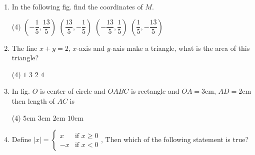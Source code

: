 \documentclass{article}
\renewcommand{\frac}{\dfrac}
\begin{document}
\begin{enumerate}
    \item In the following fig. find the coordinates of $M$.
    \begin{center}
    \end{center}
        \begin{tasks}(4)
            	\task $\left(-\frac{1}{5}, \frac{13}{5}\right)$\ans
            	\task $\left(\frac{13}{5}, -\frac{1}{5}\right)$
            	\task $\left(-\frac{13}{5}, \frac{1}{5}\right)$
            	\task $\left(\frac{1}{5}, -\frac{13}{5}\right)$
        \end{tasks}
    \item The line $x+y=2$, $x$-axis and $y$-axis make a triangle, what is the area of this triangle?
        \begin{tasks}(4)
            	\task $1$
            	\task $3$
            	\task $2$\ans
            	\task $4$
        \end{tasks}
    \item In fig. $O$ is center of circle and $OABC$ is rectangle and $OA=3$cm, $AD=2$cm then length of $AC$ is
    \begin{center}
    \end{center}
        \begin{tasks}(4)
            	\task $5$cm\ans
            	\task $3$cm
            	\task $2$cm
            	\task $10$cm
        \end{tasks}
    \item Define $|x| = \begin{cases} 
          x & \text{if } x\geq 0 \\
          -x & \text{if } x<0 
       \end{cases}$, Then which of the following statement is true?

\end{enumerate}
\end{document}
